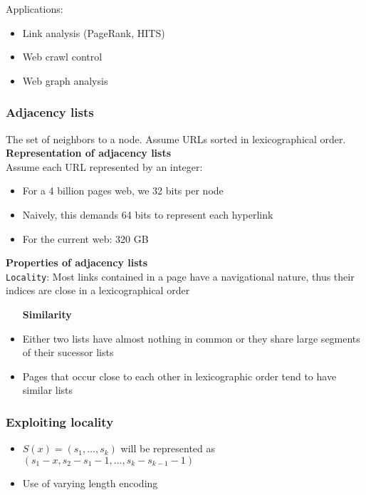Applications:
\begin{itemize}
\item Link analysis (PageRank, HITS)
\item Web crawl control
\item Web graph analysis
\end{itemize}

\subsubsection{Adjacency lists}
The set of neighbors to a node. Assume URLs sorted in lexicographical
order. \\

\textbf{Representation of adjacency lists} \\
Assume each URL represented by an integer:
\begin{itemize}
\item For a 4 billion pages web, we 32 bits per node
\item Naively, this demands 64 bits to represent each hyperlink
\item For the current web: 320 GB
\end{itemize}

\textbf{Properties of adjacency lists} \\
\texttt{Locality}: Most links contained in a page have a navigational
nature, thus their indices are close in a lexicographical order \\

\begin{itemize}
\item [\textbf{Similarity}]
\item Either two lists have almost nothing in common or
  they share large segments of their sucessor lists
\item Pages that occur close to each other in lexicographic order tend
  to have similar lists
\end{itemize}

\subsubsection{Exploiting locality}

\begin{itemize}

\item $ S(x) = (s_1, \ldots, s_k) $ will be represented as $ (s_1 - x, s_2 - s_1
  -1, \ldots, s_k - s_{k - 1} - 1) $
\item Use of varying length encoding
\end{itemize}

